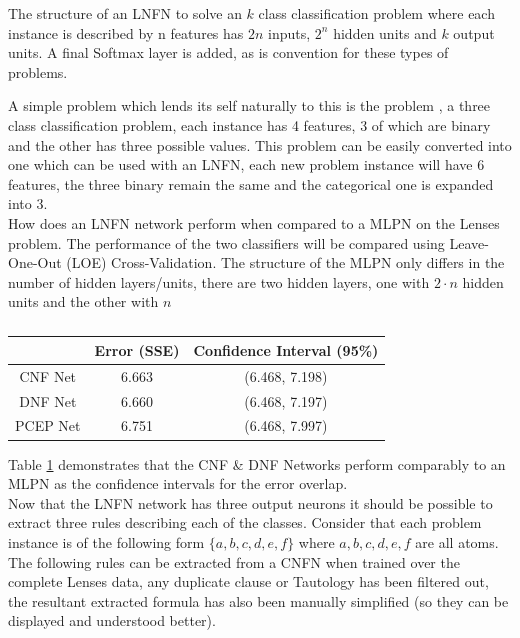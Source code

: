 \begin{definition}
	The structure of an LNFN to solve an $k$ class classification problem where each instance is described by n features has $2n$ inputs, $2^n$ hidden units and $k$ output units. A final Softmax layer is added, as is convention for these types of problems.
\end{definition}

A simple problem which lends its self naturally to this is the  problem \cite{Lichman:2013}, a three class classification problem, each instance has 4 features, 3 of which are binary and the other has three possible values. This problem can be easily converted into one which can be used with an LNFN, each new problem instance will have 6 features, the three binary remain the same and the categorical one is expanded into 3.\\

How does an LNFN network perform when compared to a MLPN on the Lenses problem. The performance of the two classifiers will be compared using Leave-One-Out (LOE) Cross-Validation. The structure of the MLPN only differs in the number of hidden layers/units, there are two hidden layers, one with $2 \cdot n$ hidden units and the other with $n$

\begin{table}[H]
	\begin{center}
		\begin{tabular}{| c | c | c |}
			\hline
			& Error (SSE) & Confidence Interval (95\%) \\
			\hline
			CNF Net & 6.663 & (6.468, 7.198) \\
			\hline
			DNF Net & 6.660 & (6.468, 7.197) \\
			\hline
			PCEP Net & 6.751 & (6.468, 7.997) \\
			\hline
		\end{tabular}
	\end{center}
	\caption{}
	\label{tab:lenses-peformance-comp}
\end{table}

Table \ref{tab:lenses-peformance-comp} demonstrates that the CNF \& DNF Networks perform comparably to an MLPN as the confidence intervals for the error overlap.\\ 

Now that the LNFN network has three output neurons it should be possible to extract three rules describing each of the classes. Consider that each problem instance is of the following form $\{a, b, c, d, e, f\}$ where $a,b,c,d,e,f$ are all atoms. The following rules can be extracted from a CNFN when trained over the complete Lenses data, any duplicate clause or Tautology has been filtered out, the resultant extracted formula has also been manually simplified (so they can be displayed and understood better).

